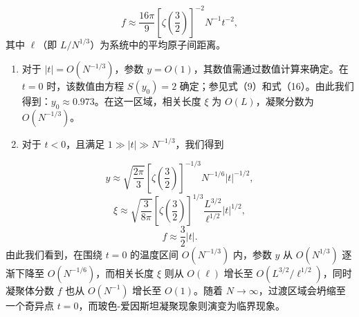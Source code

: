 \begin{equation}\tag{17.6.24}\label{eq:17.6.24}
f \approx \frac { 16 \pi } { 9 } \left[ \zeta \left( \frac { 3 } { 2 } \right) \right] ^{- 2} N ^{- 1} t ^{- 2} ,
\end{equation}
其中 \(\ell\)（即 \(L/N^{1/3}\)）为系统中的平均原子间距离。
\begin{enumerate}
\def\labelenumi{(\alph{enumi})}
\setcounter{enumi}{1}
\item
  对于 \(|t|=O(N^{-1/3})\)，参数 \(y=O(1)\)，其数值需通过数值计算来确定。在 \(t=0\) 时，该数值由方程 \(S(y_0)=2\) 确定；参见式（9）和式（16）。由此我们得到：\(y_0\approx0.973\)。在这一区域，相关长度 \(\xi\) 为 \(O(L)\)，凝聚分数为 \(O(N^{-1/3})\)。
\item
  对于 \(t < 0\)，且满足 \(1 \gg |t| \gg N^{-1/3}\)，我们得到
\end{enumerate}
\begin{equation}\tag{17.6.25}\label{eq:17.6.25}
y \approx \sqrt { \frac { 2 \pi } { 3 } } \left[ \zeta \left( \frac { 3 } { 2 } \right) \right] ^{- 1 / 3} N ^{- 1 / 6} | t | ^{- 1 / 2} ,
\end{equation}
\begin{equation}\tag{17.6.26}\label{eq:17.6.26}
\xi \approx \sqrt { \frac { 3 } { 8 \pi } } \left[ \zeta \left( \frac { 3 } { 2 } \right) \right] ^{1 / 3} \frac { L ^{3 / 2} } { \ell ^{1 / 2} } \left| t \right| ^{1 / 2} ,
\end{equation}
\begin{equation}\tag{17.6.27}\label{eq:17.6.27}
f \approx { \frac { 3 } { 2 } } | t | .
\end{equation}
由此我们看到，在围绕 \(t=0\) 的温度区间 \(O(N^{-1/3})\) 内，参数 \(y\) 从 \(O(N^{1/3})\) 逐渐下降至 \(O(N^{-1/6})\)，而相关长度 \(\xi\) 则从 \(O(\ell)\) 增长至 \(O(L^{3/2}/\ell^{1/2})\)，同时凝聚体分数 \(f\) 也从 \(O(N^{-1})\) 增长至 \(O(1)\)。随着 \(N \to \infty\)，过渡区域会坍缩至一个奇异点 \(t=0\)，而玻色-爱因斯坦凝聚现象则演变为临界现象。

